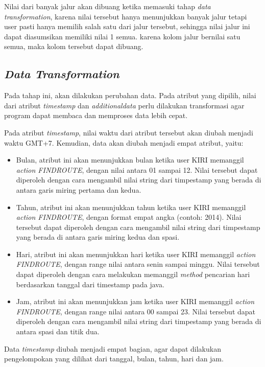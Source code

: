 Nilai dari banyak jalur akan dibuang ketika memasuki tahap \textsl{data transformation}, karena nilai tersebut hanya menunjukkan banyak jalur tetapi user pasti hanya memilih salah satu dari jalur tersebut, sehingga nilai jalur ini dapat diasumsikan memiliki nilai 1 semua. karena kolom jalur bernilai satu semua, maka kolom tersebut dapat dibuang.

\subsection{\textsl{Data Transformation}}
Pada tahap ini, akan dilakukan perubahan data. Pada atribut yang dipilih, nilai dari atribut \textsl{timestamp} dan \textsl{additionaldata} perlu dilakukan transformasi agar program dapat membaca dan memproses data lebih cepat. 

Pada atribut \textsl{timestamp}, nilai waktu dari atribut tersebut akan diubah menjadi waktu GMT+7. Kemudian, data akan diubah menjadi empat atribut, yaitu:
\begin{itemize}
	\item Bulan, atribut ini akan menunjukkan bulan ketika user KIRI memanggil \textsl{action FINDROUTE}, dengan nilai antara 01 sampai 12. Nilai tersebut dapat diperoleh dengan cara mengambil nilai string dari timpestamp yang berada di antara garis miring pertama dan kedua.
	\item Tahun, atribut ini akan menunjukkan tahun ketika user KIRI memanggil \textsl{action FINDROUTE}, dengan format empat angka (contoh: 2014). Nilai tersebut dapat diperoleh dengan cara mengambil nilai string dari timpestamp yang berada di antara garis miring kedua dan spasi.
	\item Hari, atribut ini akan menunjukkan hari ketika user KIRI memanggil \textsl{action FINDROUTE}, dengan range nilai antara senin sampai minggu. Nilai tersebut dapat diperoleh dengan cara melakukan memanggil \textsl{method} pencarian hari berdasarkan tanggal dari timestamp pada java.
	\item Jam, atribut ini akan menunjukkan jam ketika user KIRI memanggil \textsl{action FINDROUTE}, dengan range nilai antara 00 sampai 23. Nilai tersebut dapat diperoleh dengan cara mengambil nilai string dari timpestamp yang berada di antara spasi dan titik dua.
\end{itemize}

Data \textsl{timestamp} diubah menjadi empat bagian, agar dapat dilakukan pengelompokan yang dilihat dari tanggal, bulan, tahun, hari dan jam.

